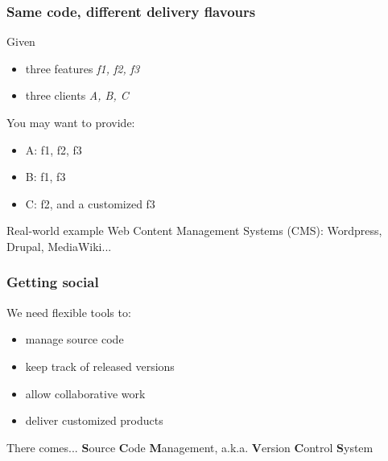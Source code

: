 \begin{frame}
  \frametitle{Same code, different delivery flavours}

  Given
  \begin{itemize}
    \item three features \textit{f1, f2, f3}
    \item three clients \textit{A, B, C}
  \end{itemize}
  You may want to provide:
  \begin{itemize}
    \item A: f1, f2, f3
    \item B: f1, f3
    \item C: f2, and a customized f3
  \end{itemize}
  \begin{exampleblock}{Real-world example}
    Web Content Management Systems (CMS): Wordpress, Drupal, MediaWiki...
  \end{exampleblock}
\end{frame}

\begin{frame}
  \frametitle{Getting social}

  We need flexible tools to:
  \begin{itemize}
    \item manage source code
    \item keep track of released versions
    \item allow collaborative work
    \item deliver customized products
  \end{itemize}
  \begin{block}{There comes...}
    \textbf{S}ource \textbf{C}ode \textbf{M}anagement,
    a.k.a. \textbf{V}ersion \textbf{C}ontrol \textbf{S}ystem
  \end{block}
\end{frame}

